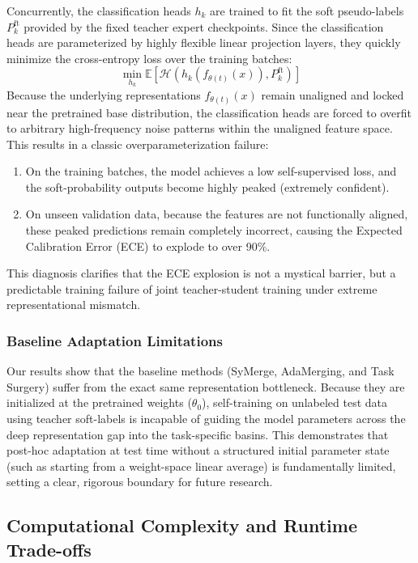 Concurrently, the classification heads $h_k$ are trained to fit the soft pseudo-labels $P_k^{\text{ft}}$ provided by the fixed teacher expert checkpoints. Since the classification heads are parameterized by highly flexible linear projection layers, they quickly minimize the cross-entropy loss over the training batches:
\begin{equation}
    \min_{h_k} \mathbb{E} \left[ \mathcal{H} \left( h_k(f_{\theta(t)}(x)), P_k^{\text{ft}} \right) \right]
\end{equation}
Because the underlying representations $f_{\theta(t)}(x)$ remain unaligned and locked near the pretrained base distribution, the classification heads are forced to overfit to arbitrary high-frequency noise patterns within the unaligned feature space. This results in a classic overparameterization failure:
\begin{enumerate}
    \item On the training batches, the model achieves a low self-supervised loss, and the soft-probability outputs become highly peaked (extremely confident).
    \item On unseen validation data, because the features are not functionally aligned, these peaked predictions remain completely incorrect, causing the Expected Calibration Error (ECE) to explode to over 90\%.
\end{enumerate}
This diagnosis clarifies that the ECE explosion is not a mystical barrier, but a predictable training failure of joint teacher-student training under extreme representational mismatch.

\subsubsection{Baseline Adaptation Limitations}
Our results show that the baseline methods (SyMerge, AdaMerging, and Task Surgery) suffer from the exact same representation bottleneck. Because they are initialized at the pretrained weights ($\theta_0$), self-training on unlabeled test data using teacher soft-labels is incapable of guiding the model parameters across the deep representation gap into the task-specific basins. This demonstrates that post-hoc adaptation at test time without a structured initial parameter state (such as starting from a weight-space linear average) is fundamentally limited, setting a clear, rigorous boundary for future research.

\subsection{Computational Complexity and Runtime Trade-offs}
\label{subsec:complexity}

